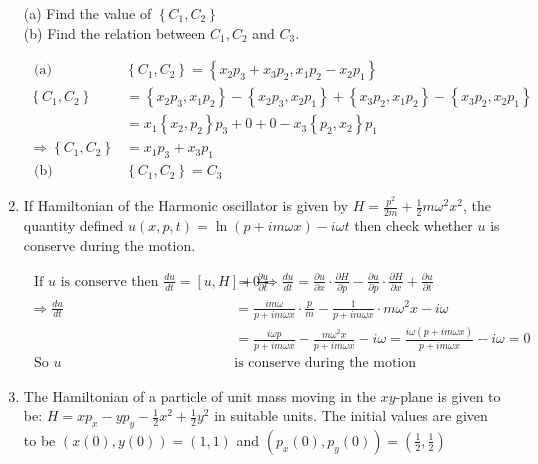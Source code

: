 \begin{enumerate}
(a) Find the value of $\left\{C_{1}, C_{2}\right\}$\\
(b) Find the relation between $C_{1}, C_{2}$ and $C_{3}$.
\begin{answer}
	\begin{align*}
	\text { (a) }&\left\{C_{1}, C_{2}\right\}=\left\{x_{2} p_{3}+x_{3} p_{2}, x_{1} p_{2}-x_{2} p_{1}\right\}\\
	\left\{C_{1}, C_{2}\right\}&=\left\{x_{2} p_{3}, x_{1} p_{2}\right\}-\left\{x_{2} p_{3}, x_{2} p_{1}\right\}+\left\{x_{3} p_{2}, x_{1} p_{2}\right\}-\left\{x_{3} p_{2}, x_{2} p_{1}\right\}\\
	&=x_{1}\left\{x_{2}, p_{2}\right\} p_{3}+0+0-x_{3}\left\{p_{2}, x_{2}\right\} p_{1}\\
	\Rightarrow\left\{C_{1}, C_{2}\right\}&=x_{1} p_{3}+x_{3} p_{1}\\
	\text { (b) }&\left\{C_{1}, C_{2}\right\}=C_{3}
	\end{align*}
\end{answer}
\item If Hamiltonian of the Harmonic oscillator is given by $H=\frac{p^{2}}{2 m}+\frac{1}{2} m \omega^{2} x^{2}$, the quantity defined $u(x, p, t)=\ln (p+i m \omega x)-i \omega t$ then check whether $u$ is conserve during the motion.
\begin{answer}
	\begin{align*}
	\text { If } u \text { is conserve then } \frac{d u}{d t}=[u, H]+\frac{\partial u}{\partial t}&=0 \Rightarrow \frac{d u}{d t}=\frac{\partial u}{\partial x} \cdot \frac{\partial H}{\partial p}-\frac{\partial u}{\partial p} \cdot \frac{\partial H}{\partial x}+\frac{\partial u}{\partial t}\\
	\Rightarrow \frac{d u}{d t}&=\frac{i m \omega}{p+i m \omega x} \cdot \frac{p}{m}-\frac{1}{p+i m \omega x} \cdot m \omega^{2} x-i \omega\\
	&=\frac{i \omega p}{p+i m \omega x}-\frac{m \omega^{2} x}{p+i m \omega x}-i \omega=\frac{i \omega(p+i m \omega x)}{p+i m \omega x}-i \omega=0\\
	\text { So $u$ }&\text{is conserve during the motion }
	\end{align*}
\end{answer}
\item The Hamiltonian of a particle of unit mass moving in the $x y$-plane is given to be: $H=x p_{x}-y p_{y}-\frac{1}{2} x^{2}+\frac{1}{2} y^{2}$ in suitable units. The initial values are given to be $(x(0), y(0))=(1,1)$ and $\left(p_{x}(0), p_{y}(0)\right)=\left(\frac{1}{2}, \frac{1}{2}\right)$\\

\end{enumerate}

